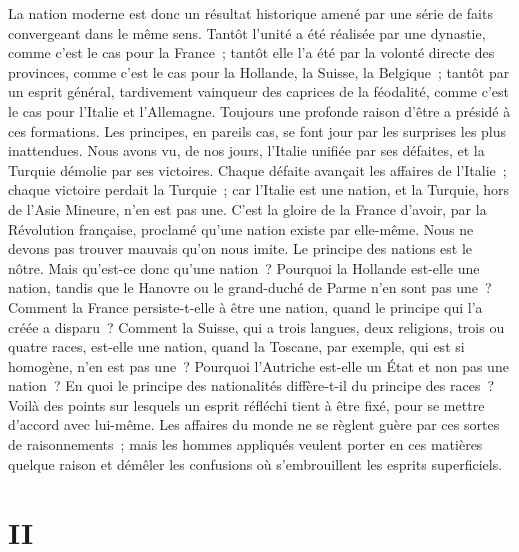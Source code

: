 \documentclass[french,twoside]{book} %
\newcommand\orgName[1]{#1}
\newcommand\placeName[1]{#1}
\newcommand\chapteropen{} %
\newcommand\chapterclose{} %
\begin{document}
La nation moderne est donc un résultat historique amené par une série de faits convergeant dans le même sens. Tantôt l’unité a été réalisée par une dynastie, comme c’est le cas pour la {\placeName France} ; tantôt elle l’a été par la volonté directe des provinces, comme c’est le cas pour la {\placeName Hollande}, la {\placeName Suisse}, la {\placeName Belgique} ; tantôt par un esprit général, tardivement vainqueur des caprices de la féodalité, comme c’est le cas pour l’{\placeName Italie} et l’{\placeName Allemagne}. Toujours une profonde raison d’être a présidé à ces formations. Les principes, en pareils cas, se font jour par les surprises les plus inattendues. Nous avons vu, de nos jours, l’{\orgName Italie} unifiée par ses défaites, et la {\orgName Turquie} démolie par ses victoires. Chaque défaite avançait les affaires de l’{\orgName Italie} ; chaque victoire perdait la {\orgName Turquie} ; car l’{\orgName Italie} est une nation, et la {\orgName Turquie}, hors de l’{\placeName Asie Mineure}, n’en est pas une. C’est la gloire de la {\orgName France} d’avoir, par la Révolution française, proclamé qu’une nation existe par elle-même. Nous ne devons pas trouver mauvais qu’on nous imite. Le principe des nations est le nôtre. Mais qu’est-ce donc qu’une nation ? Pourquoi la {\placeName Hollande} est-elle une nation, tandis que le {\placeName Hanovre} ou le {\placeName grand-duché de Parme} n’en sont pas une ? Comment la {\placeName France} persiste-t-elle à être une nation, quand le principe qui l’a créée a disparu ? Comment la {\placeName Suisse}, qui a trois langues, deux religions, trois ou quatre races, est-elle une nation, quand la {\placeName Toscane}, par exemple, qui est si homogène, n’en est pas une ? Pourquoi l’{\placeName Autriche} est-elle un État et non pas une nation ? En quoi le principe des nationalités diffère-t-il du principe des races ? Voilà des points sur lesquels un esprit réfléchi tient à être fixé, pour se mettre d’accord avec lui-même. Les affaires du monde ne se règlent guère par ces sortes de raisonnements ; mais les hommes appliqués veulent porter en ces matières quelque raison et démêler les confusions où s’embrouillent les esprits superficiels.
\chapterclose


\chapteropen
\chapter[{II}]{II}\renewcommand{\leftmark}{II}
\end{document}
